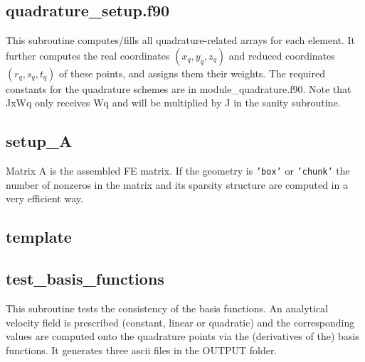  \subsection{quadrature\_setup.f90}
 This subroutine computes/fills all quadrature-related arrays for each element.
 It further computes the real coordinates $(x_q,y_q,z_q)$ and reduced 
 coordinates $(r_q,s_q,t_q)$ of these points, and assigns them their weights.
 The required constants for the quadrature schemes are in 
 {\filenamefont module\_quadrature.f90}.
 Note that JxWq only receives Wq and will be multiplied by J in the sanity subroutine.
 \subsection{setup\_A}
 Matrix A is the assembled FE matrix.
 If the geometry is {\tt 'box'} or {\tt 'chunk'} the number of nonzeros in the matrix and 
 its sparsity  structure are computed in a very efficient way. 
 \subsection{template}

 \subsection{test\_basis\_functions}
 This subroutine tests the consistency of the basis functions. 
 An analytical velocity field is prescribed (constant, linear or quadratic) and the 
 corresponding values are computed onto the quadrature points via the 
 (derivatives of the) basis functions.
 It generates three ascii files in the {\foldernamefont OUTPUT} folder.

